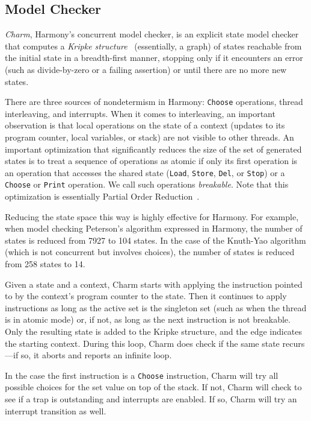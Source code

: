 \documentclass[twocolumn]{article}
\begin{document}
\subsection{Model Checker}

\emph{Charm}, Harmony's concurrent model checker, is an explicit state model
checker that computes a \emph{Kripke structure}~\cite{Kripke1963}
(essentially, a graph) of states reachable
from the initial state in a breadth-first manner, stopping only if
it encounters an error (such as divide-by-zero or a failing assertion)
or until there are no more new states.

There are three sources of nondetermism in Harmony: \texttt{Choose}
operations, thread interleaving, and interrupts.
When it comes to interleaving, an important observation is that
local operations on the state of a context (updates to its program
counter, local variables, or stack) are not visible to other threads.
An important optimization that significantly
reduces the size of the set of generated states is to treat a
sequence of operations as atomic if only its first operation is an
operation that accesses the shared state (\texttt{Load}, \texttt{Store},
\texttt{Del}, or \texttt{Stop}) or a \texttt{Choose} or \texttt{Print}
operation.  We call such operations \emph{breakable}.
Note that this optimization is essentially Partial Order
Reduction~\cite{Val91}.

Reducing the state space this way is highly effective for Harmony.
For example, when model checking Peterson's algorithm expressed in
Harmony, the number of states is reduced from 7927 to 104 states.
In the case of the Knuth-Yao algorithm (which is not concurrent but
involves choices), the number of states is reduced from 258 states
to 14.

Given a state and a context, Charm starts with applying the instruction
pointed to by the context's program counter to the state.
Then it continues to apply instructions as long as
the active set is the singleton set (such as when the thread is in
atomic mode) or, if not, as long as the next instruction is not
breakable.  Only the resulting state is added to the Kripke structure,
and the edge indicates the starting context.  During this loop, Charm
does check if the same state recurs---if so, it aborts
and reports an infinite loop.

In the case the first instruction is a \texttt{Choose} instruction,
Charm will try all possible choices for the set value
on top of the stack.  If not, Charm will check to
see if a trap is outstanding and interrupts are enabled.  If so,
Charm will try an interrupt transition as well.
\end{document}
